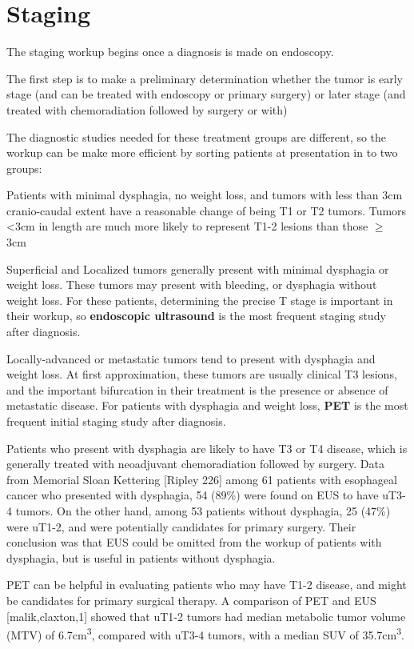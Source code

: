 \documentclass[
]{book}
\begin{document}
\hypertarget{staging}{%
\chapter{Staging}\label{staging}}

The staging workup begins once a diagnosis is made on endoscopy.

The first step is to make a preliminary determination whether the tumor is early stage (and can be treated with endoscopy or primary surgery) or later stage (and treated with chemoradiation followed by surgery or with)

The diagnostic studies needed for these treatment groups are different, so the workup can be make more efficient by sorting patients at presentation in to two groups:

Patients with minimal dysphagia, no weight loss, and tumors with less than 3cm cranio-caudal extent have a reasonable change of being T1 or T2 tumors. Tumors \textless3cm in length are much more likely to represent T1-2 lesions than those \(\geq\) 3cm\citep{hollis1114}

Superficial and Localized tumors generally present with minimal dysphagia or weight loss. These tumors may present with bleeding, or dysphagia without weight loss. For these patients, determining the precise T stage is important in their workup, so \textbf{endoscopic ultrasound} is the most frequent staging study after diagnosis.

Locally-advanced or metastatic tumors tend to present with dysphagia and weight loss. At first approximation, these tumors are usually clinical T3 lesions, and the important bifurcation in their treatment is the presence or absence of metastatic disease. For patients with dysphagia and weight loss, \textbf{PET} is the most frequent initial staging study after diagnosis.

Patients who present with dysphagia are likely to have T3 or T4 disease, which is generally treated with neoadjuvant chemoradiation followed by surgery. Data from Memorial Sloan Kettering {[}Ripley 226{]} among 61 patients with esophageal cancer who presented with dysphagia, 54 (89\%) were found on EUS to have uT3-4 tumors. On the other hand, among 53 patients without dysphagia, 25 (47\%) were uT1-2, and were potentially candidates for primary surgery. Their conclusion was that EUS could be omitted from the workup of patients with dysphagia, but is useful in patients without dysphagia.

PET can be helpful in evaluating patients who may have T1-2 disease, and might be candidates for primary surgical therapy. A comparison of PET and EUS {[}malik,claxton,1{]} showed that uT1-2 tumors had median metabolic tumor volume (MTV) of 6.7cm\textsuperscript{3}, compared with uT3-4 tumors, with a median SUV of 35.7cm\textsuperscript{3}.
\end{document}
